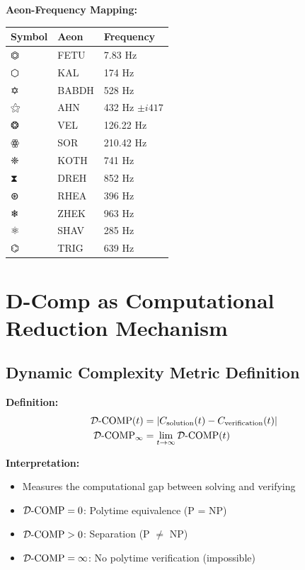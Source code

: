 \textbf{Aeon-Frequency Mapping:}
\begin{table}[h]
\centering
\begin{tabular}{lll}
\toprule
Symbol & Aeon & Frequency \\
\midrule
⏣ & FETU & 7.83 Hz \\
⬡ & KAL & 174 Hz \\
✡ & BABDH & 528 Hz \\
⚝ & AHN & 432 Hz $\pm i417$ \\
❂ & VEL & 126.22 Hz \\
ꙮ & SOR & 210.42 Hz \\
❈ & KOTH & 741 Hz \\
⧗ & DREH & 852 Hz \\
⊛ & RHEA & 396 Hz \\
❄ & ZHEK & 963 Hz \\
⚛ & SHAV & 285 Hz \\
⌬ & TRIG & 639 Hz \\
\bottomrule
\end{tabular}
\end{table}

\section{D-Comp as Computational Reduction Mechanism}

\subsection{Dynamic Complexity Metric Definition}

\textbf{Definition:}
\begin{align}
    \mathcal{D}\text{-}\mathrm{COMP}(t) &= |C_{\text{solution}}(t) - C_{\text{verification}}(t)| \\
    \mathcal{D}\text{-}\mathrm{COMP}_{\infty} &= \lim_{t \to \infty} \mathcal{D}\text{-}\mathrm{COMP}(t)
\end{align}

\textbf{Interpretation:}
\begin{itemize}
    \item Measures the computational gap between solving and verifying
    \item $\mathcal{D}\text{-}\mathrm{COMP} = 0$: Polytime equivalence (P = NP)
    \item $\mathcal{D}\text{-}\mathrm{COMP} > 0$: Separation (P $\neq$ NP)
    \item $\mathcal{D}\text{-}\mathrm{COMP} = \infty$: No polytime verification (impossible)
\end{itemize}

